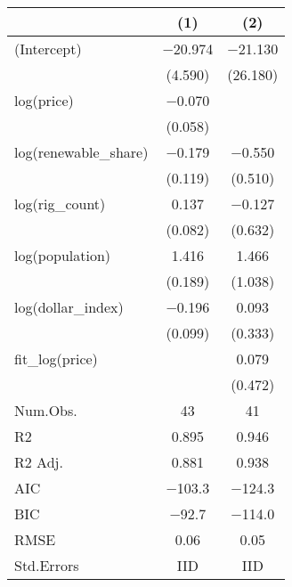 \begin{table}
\centering
\begin{tabular}[t]{lcc}
\toprule
  & (1) & (2)\\
\midrule
(Intercept) & \num{-20.974} & \num{-21.130}\\
 & (\num{4.590}) & (\num{26.180})\\
log(price) & \num{-0.070} & \\
 & (\num{0.058}) & \\
log(renewable\_share) & \num{-0.179} & \num{-0.550}\\
 & (\num{0.119}) & (\num{0.510})\\
log(rig\_count) & \num{0.137} & \num{-0.127}\\
 & (\num{0.082}) & (\num{0.632})\\
log(population) & \num{1.416} & \num{1.466}\\
 & (\num{0.189}) & (\num{1.038})\\
log(dollar\_index) & \num{-0.196} & \num{0.093}\\
 & (\num{0.099}) & (\num{0.333})\\
fit\_log(price) &  & \num{0.079}\\
 &  & (\num{0.472})\\
\midrule
Num.Obs. & \num{43} & \num{41}\\
R2 & \num{0.895} & \num{0.946}\\
R2 Adj. & \num{0.881} & \num{0.938}\\
AIC & \num{-103.3} & \num{-124.3}\\
BIC & \num{-92.7} & \num{-114.0}\\
RMSE & \num{0.06} & \num{0.05}\\
Std.Errors & IID & IID\\
\bottomrule
\end{tabular}
\end{table}
